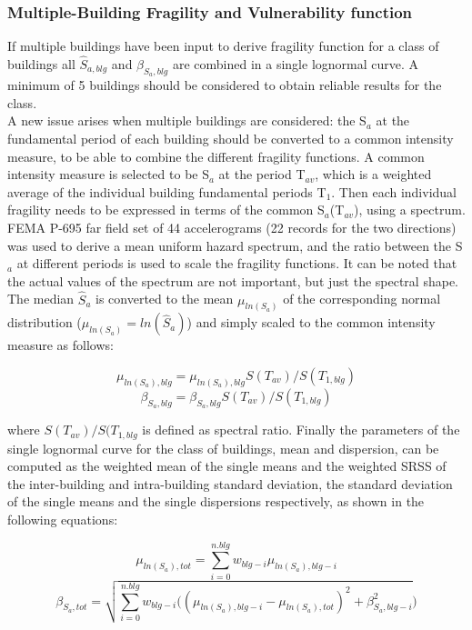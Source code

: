\subsubsection{Multiple-Building Fragility and Vulnerability function}
\label{subsubsec:multiple-buildings}
If multiple buildings have been input to derive fragility function for a class of buildings all $\hat{S}_{a, blg}$ and $\beta_{S_a, blg}$ are combined in a single lognormal curve. A minimum of 5 buildings should be considered to obtain reliable results for the class.\\ 
A new issue arises when multiple buildings are considered: the S$_a$ at the fundamental period of each building should be converted to a common intensity measure, to be able to combine the different fragility functions. A common intensity measure is selected to be S$_a$ at the period T$_{av}$, which is a weighted average of the individual building fundamental periods T$_1$. Then each individual fragility needs to be expressed in terms of the common S$_a$(T$_{av}$), using a spectrum. FEMA P-695 \citep{ATC2007} far field set of 44 accelerograms (22 records for the two directions) was used to derive a mean uniform hazard spectrum, and the ratio between the S$_a$ at different periods is used to scale the fragility functions. It can be noted that the actual values of the spectrum are not important, but just the spectral shape. 
The median $\hat{S}_a$ is converted to the mean $\mu_{ln(S_a)}$ of the corresponding normal distribution ($\mu_{ln(S_a)} = ln(\hat{S}_a)$) and simply scaled to the common intensity measure as follows:

\begin{equation}
\mu_{ln(S_a), blg} = \mu_{ln(S_a), blg} S(T_{av})/ S(T_{1, blg})
\end{equation}
\begin{equation}
\beta_{S_a, blg} = \beta_{S_a, blg} S(T_{av})/ S(T_{1, blg})
\label{eq:Sa(Tav)}
\end{equation}

where $S(T_{av})/ S(T_{1, blg}$ is defined as spectral ratio. Finally the parameters of the single lognormal curve for the class of buildings, mean and dispersion, can be computed as the weighted mean of the single means and the weighted SRSS of the inter-building and intra-building standard deviation, the standard deviation of the single means and the single dispersions respectively, as shown in the following equations:

\begin{equation}
\mu_{ln(S_a), tot} = \sum_{i=0}^{n.blg} w_{blg-i} \mu_{ln(S_a), blg-i}
\label{eq:combination-lognormals-mu}
\end{equation}
\begin{equation}
\beta_{S_a, tot} = \sqrt{ \sum_{i=0}^{n.blg} w_{blg-i} ((\mu_{ln(S_a), blg-i}-\mu_{ln(S_a), tot})^2+ \beta_{S_a, blg-i}^2})
\label{eq:combination-lognormals-sigma}
\end{equation}

